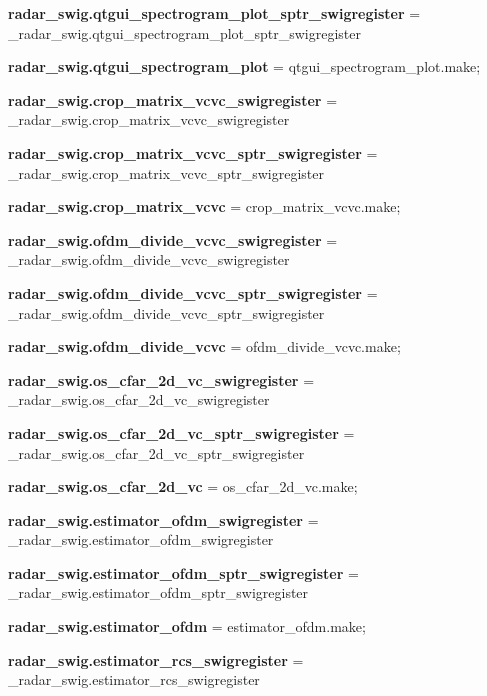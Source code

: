 \begin{DoxyCompactItemize}
\item 
{\bf radar\+\_\+swig.\+qtgui\+\_\+spectrogram\+\_\+plot\+\_\+sptr\+\_\+swigregister} = \+\_\+radar\+\_\+swig.\+qtgui\+\_\+spectrogram\+\_\+plot\+\_\+sptr\+\_\+swigregister
\item 
{\bf radar\+\_\+swig.\+qtgui\+\_\+spectrogram\+\_\+plot} = qtgui\+\_\+spectrogram\+\_\+plot.\+make;
\item 
{\bf radar\+\_\+swig.\+crop\+\_\+matrix\+\_\+vcvc\+\_\+swigregister} = \+\_\+radar\+\_\+swig.\+crop\+\_\+matrix\+\_\+vcvc\+\_\+swigregister
\item 
{\bf radar\+\_\+swig.\+crop\+\_\+matrix\+\_\+vcvc\+\_\+sptr\+\_\+swigregister} = \+\_\+radar\+\_\+swig.\+crop\+\_\+matrix\+\_\+vcvc\+\_\+sptr\+\_\+swigregister
\item 
{\bf radar\+\_\+swig.\+crop\+\_\+matrix\+\_\+vcvc} = crop\+\_\+matrix\+\_\+vcvc.\+make;
\item 
{\bf radar\+\_\+swig.\+ofdm\+\_\+divide\+\_\+vcvc\+\_\+swigregister} = \+\_\+radar\+\_\+swig.\+ofdm\+\_\+divide\+\_\+vcvc\+\_\+swigregister
\item 
{\bf radar\+\_\+swig.\+ofdm\+\_\+divide\+\_\+vcvc\+\_\+sptr\+\_\+swigregister} = \+\_\+radar\+\_\+swig.\+ofdm\+\_\+divide\+\_\+vcvc\+\_\+sptr\+\_\+swigregister
\item 
{\bf radar\+\_\+swig.\+ofdm\+\_\+divide\+\_\+vcvc} = ofdm\+\_\+divide\+\_\+vcvc.\+make;
\item 
{\bf radar\+\_\+swig.\+os\+\_\+cfar\+\_\+2d\+\_\+vc\+\_\+swigregister} = \+\_\+radar\+\_\+swig.\+os\+\_\+cfar\+\_\+2d\+\_\+vc\+\_\+swigregister
\item 
{\bf radar\+\_\+swig.\+os\+\_\+cfar\+\_\+2d\+\_\+vc\+\_\+sptr\+\_\+swigregister} = \+\_\+radar\+\_\+swig.\+os\+\_\+cfar\+\_\+2d\+\_\+vc\+\_\+sptr\+\_\+swigregister
\item 
{\bf radar\+\_\+swig.\+os\+\_\+cfar\+\_\+2d\+\_\+vc} = os\+\_\+cfar\+\_\+2d\+\_\+vc.\+make;
\item 
{\bf radar\+\_\+swig.\+estimator\+\_\+ofdm\+\_\+swigregister} = \+\_\+radar\+\_\+swig.\+estimator\+\_\+ofdm\+\_\+swigregister
\item 
{\bf radar\+\_\+swig.\+estimator\+\_\+ofdm\+\_\+sptr\+\_\+swigregister} = \+\_\+radar\+\_\+swig.\+estimator\+\_\+ofdm\+\_\+sptr\+\_\+swigregister
\item 
{\bf radar\+\_\+swig.\+estimator\+\_\+ofdm} = estimator\+\_\+ofdm.\+make;
\item 
{\bf radar\+\_\+swig.\+estimator\+\_\+rcs\+\_\+swigregister} = \+\_\+radar\+\_\+swig.\+estimator\+\_\+rcs\+\_\+swigregister

\end{DoxyCompactItemize}
